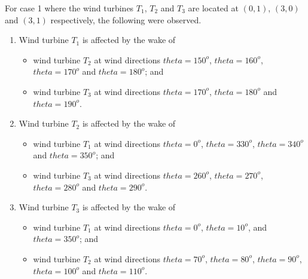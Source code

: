     For case 1 where the wind turbines $T_1$, $T_2$ and $T_3$ are located at $(0,1)$, $(3,0)$ and $(3,1)$ respectively, the following were observed.
    \begin{enumerate}[label=(\subscript{u}{{\arabic*}})]
        \item Wind turbine $T_1$ is affected by the wake of
            \begin{itemize}
                \item wind turbine $T_2$ at wind directions $theta=150^o$, $theta=160^o$, $theta=170^o$ and $theta=180^o$; and
                \item wind turbine $T_3$ at wind directions $theta=170^o$, $theta=180^o$ and $theta=190^o$.
            \end{itemize}
        \item Wind turbine $T_2$ is affected by the wake of
            \begin{itemize}
                \item wind turbine $T_1$ at wind directions $theta=0^o$, $theta=330^o$, $theta=340^o$ and $theta=350^o$; and
                \item wind turbine $T_3$ at wind directions $theta=260^o$, $theta=270^o$, $theta=280^o$ and $theta=290^o$.
            \end{itemize}
        \item Wind turbine $T_3$ is affected by the wake of
            \begin{itemize}
                \item wind turbine $T_1$ at wind directions $theta=0^o$, $theta=10^o$, and $theta=350^o$; and
                \item wind turbine $T_2$ at wind directions $theta=70^o$, $theta=80^o$, $theta=90^o$, $theta=100^o$ and $theta=110^o$.
            \end{itemize}
    \end{enumerate}
    
